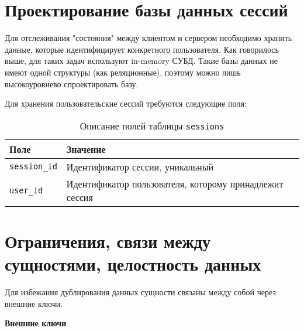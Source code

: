 \section{Проектирование базы данных сессий}
Для отслеживания "состояния" между клиентом и сервером необходимо хранить данные, которые идентифицирует конкретного пользователя. Как говорилось выше, для таких задач используют in-memory СУБД.  
Такие базы данных не имеют одной структуры (как реляционные), поэтому можно лишь высокоуровнево спроектировать базу.

Для хранения пользовательские сессий требуются следующие поля:
\begin{table}[!ht]
    \caption{Описание полей таблицы \texttt{sessions}}
    \label{tbl:sessions}
    \begin{center}
        \begin{tabular}{|p{}p{}|}
            \hline
            \textbf{Поле} & \textbf{Значение} \\\hline
            \texttt{session\_id} & Идентификатор сессии, уникальный \\\hline
            \texttt{user\_id} & Идентификатор пользователя, которому принадлежит сессия \\\hline
        \end{tabular}
    \end{center}
\end{table}
\newpage
\section{Ограничения, связи между сущностями, целостность данных}
Для избежания дублирования данных сущности связаны между собой через внешние ключи.

\noindent\textbf{Внешние ключи}

